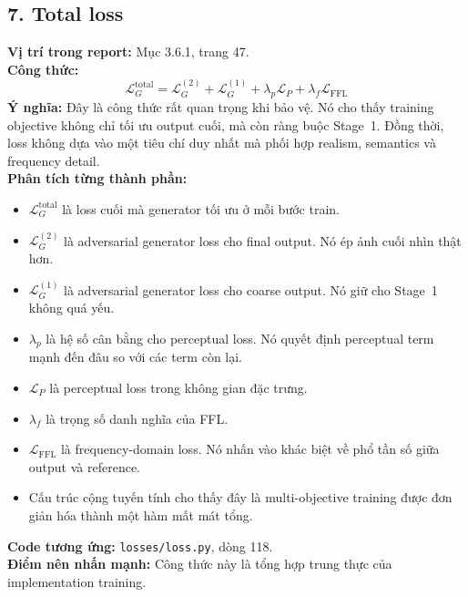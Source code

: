 \documentclass[12pt,a4paper]{article}
\begin{document}
\subsection*{7. Total loss}
\textbf{Vị trí trong report:} Mục 3.6.1, trang 47.\\
\textbf{Công thức:}
\[
\mathcal{L}_{G}^{\mathrm{total}} =
\mathcal{L}_{G}^{(2)} + \mathcal{L}_{G}^{(1)} + \lambda_{p}\mathcal{L}_{P} + \lambda_{f}\mathcal{L}_{\mathrm{FFL}}
\]
\textbf{Ý nghĩa:} Đây là công thức rất quan trọng khi bảo vệ. Nó cho thấy training objective không chỉ tối ưu output cuối, mà còn ràng buộc Stage~1. Đồng thời, loss không dựa vào một tiêu chí duy nhất mà phối hợp realism, semantics và frequency detail.\\
\textbf{Phân tích từng thành phần:}
\begin{itemize}[leftmargin=1.5em]
\item $\mathcal{L}_{G}^{\mathrm{total}}$ là loss cuối mà generator tối ưu ở mỗi bước train.
\item $\mathcal{L}_{G}^{(2)}$ là adversarial generator loss cho final output. Nó ép ảnh cuối nhìn thật hơn.
\item $\mathcal{L}_{G}^{(1)}$ là adversarial generator loss cho coarse output. Nó giữ cho Stage~1 không quá yếu.
\item $\lambda_p$ là hệ số cân bằng cho perceptual loss. Nó quyết định perceptual term mạnh đến đâu so với các term còn lại.
\item $\mathcal{L}_{P}$ là perceptual loss trong không gian đặc trưng.
\item $\lambda_f$ là trọng số danh nghĩa của FFL.
\item $\mathcal{L}_{\mathrm{FFL}}$ là frequency-domain loss. Nó nhấn vào khác biệt về phổ tần số giữa output và reference.
\item Cấu trúc cộng tuyến tính cho thấy đây là multi-objective training được đơn giản hóa thành một hàm mất mát tổng.
\end{itemize}
\textbf{Code tương ứng:} \texttt{losses/loss.py}, dòng 118.\\
\textbf{Điểm nên nhấn mạnh:} Công thức này là tổng hợp trung thực của implementation training.
\end{document}
